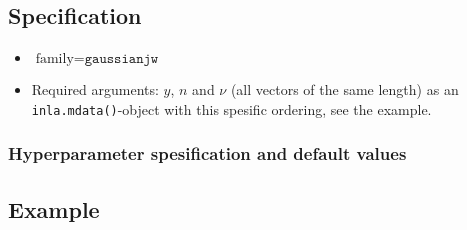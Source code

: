 \documentclass[a4paper,11pt]{article}
\begin{document}
\subsection*{Specification}

\begin{itemize}
\item $\text{family}=\texttt{gaussianjw}$
\item Required arguments: $y$, $n$ and $\nu$ (all vectors of the same
    length) as an \texttt{inla.mdata()}-object with this spesific
    ordering, see the example.
\end{itemize}



\subsubsection*{Hyperparameter spesification and default values}


\subsection*{Example}

\end{document}
